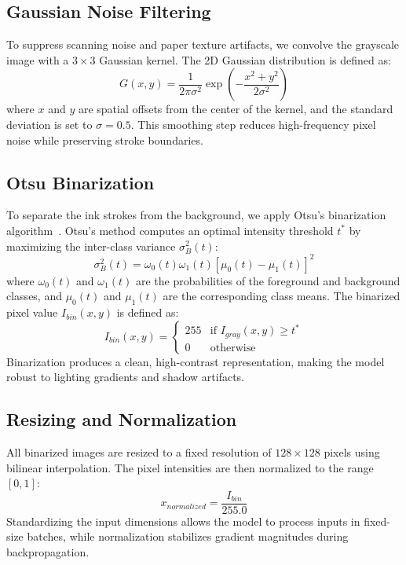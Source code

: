 \subsection{Gaussian Noise Filtering}
To suppress scanning noise and paper texture artifacts, we convolve the grayscale image with a $3 \times 3$ Gaussian kernel. The 2D Gaussian distribution is defined as:
\begin{equation}
    G(x, y) = \frac{1}{2\pi\sigma^2} \exp\left( -\frac{x^2 + y^2}{2\sigma^2} \right)
\end{equation}
where $x$ and $y$ are spatial offsets from the center of the kernel, and the standard deviation is set to $\sigma = 0.5$. This smoothing step reduces high-frequency pixel noise while preserving stroke boundaries.

\subsection{Otsu Binarization}
To separate the ink strokes from the background, we apply Otsu's binarization algorithm~\cite{otsu1979threshold}. Otsu's method computes an optimal intensity threshold $t^*$ by maximizing the inter-class variance $\sigma_B^2(t)$:
\begin{equation}
    \sigma_B^2(t) = \omega_0(t) \omega_1(t) \left[ \mu_0(t) - \mu_1(t) \right]^2
\end{equation}
where $\omega_0(t)$ and $\omega_1(t)$ are the probabilities of the foreground and background classes, and $\mu_0(t)$ and $\mu_1(t)$ are the corresponding class means. The binarized pixel value $I_{bin}(x, y)$ is defined as:
\begin{equation}
    I_{bin}(x, y) = \begin{cases} 
        255 & \text{if } I_{gray}(x, y) \ge t^* \\
        0   & \text{otherwise}
    \end{cases}
\end{equation}
Binarization produces a clean, high-contrast representation, making the model robust to lighting gradients and shadow artifacts.

\subsection{Resizing and Normalization}
All binarized images are resized to a fixed resolution of $128 \times 128$ pixels using bilinear interpolation. The pixel intensities are then normalized to the range $[0, 1]$:
\begin{equation}
    x_{normalized} = \frac{I_{bin}}{255.0}
\end{equation}
Standardizing the input dimensions allows the model to process inputs in fixed-size batches, while normalization stabilizes gradient magnitudes during backpropagation.

